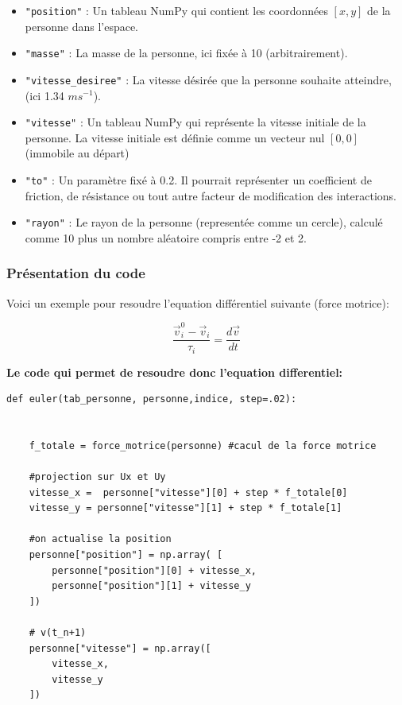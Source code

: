 \documentclass[a4paper,12pt]{article}
\begin{document}
\begin{itemize}
    \item \texttt{"position"} : Un tableau NumPy qui contient les coordonnées \([x, y]\) de la personne dans l'espace. 
    
    \item \texttt{"masse"} : La masse de la personne, ici fixée à 10 (arbitrairement).
    
    \item \texttt{"vitesse\_desiree"} : La vitesse désirée que la personne souhaite atteindre, (ici 1.34 $ms^{-1}$).
    
    \item \texttt{"vitesse"} : Un tableau NumPy qui représente la vitesse initiale de la personne. La vitesse initiale est définie comme un vecteur nul \([0, 0]\) (immobile au départ)
    
    \item \texttt{"to"} : Un paramètre fixé à 0.2. Il pourrait représenter un coefficient de friction, de résistance ou tout autre facteur de modification des interactions.
    
    \item \texttt{"rayon"} : Le rayon de la personne (representée comme un cercle), calculé comme 10 plus un nombre aléatoire compris entre -2 et 2. 
\end{itemize}

\subsubsection{Présentation du code}

Voici un exemple pour resoudre l'equation différentiel suivante (force motrice):

\begin{equation}
\frac{\vec{v}_i^0 - \vec{v}_i}{\tau_i} = \frac{d\vec{v}}{dt}
\end{equation}

\newpage

\textbf{Le code qui permet de resoudre donc l'equation differentiel:}

\begin{verbatim}
def euler(tab_personne, personne,indice, step=.02):

    
    f_totale = force_motrice(personne) #cacul de la force motrice

    #projection sur Ux et Uy
    vitesse_x =  personne["vitesse"][0] + step * f_totale[0]
    vitesse_y = personne["vitesse"][1] + step * f_totale[1]
    
    #on actualise la position
    personne["position"] = np.array( [
        personne["position"][0] + vitesse_x,
        personne["position"][1] + vitesse_y 
    ])

    # v(t_n+1)
    personne["vitesse"] = np.array([
        vitesse_x,
        vitesse_y
    ])
\end{verbatim}
\end{document}
